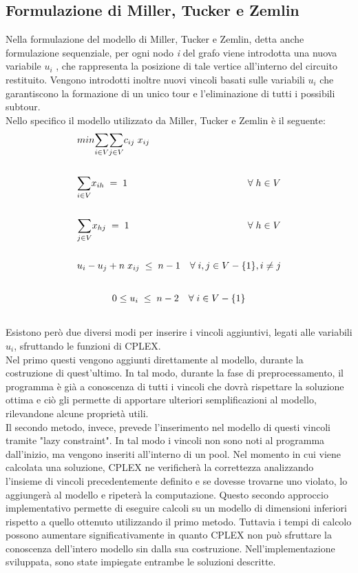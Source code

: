 \subsection{Formulazione di Miller, Tucker e Zemlin}
Nella formulazione del modello di Miller, Tucker e Zemlin, detta anche formulazione sequenziale, per ogni nodo \textit{i} del grafo viene introdotta una nuova variabile $u_i$ , che rappresenta la posizione di tale vertice all'interno del circuito restituito. Vengono introdotti inoltre nuovi vincoli basati sulle variabili $u_i$ che garantiscono la formazione di un unico tour e l'eliminazione di tutti i possibili subtour.\\
Nello specifico il modello utilizzato da Miller, Tucker e Zemlin è il seguente:
\begin{align}
& min \underset{i\in V}\sum{}\underset{j\in V}\sum{c_{ij}\; x_{ij}} \\ \notag \\
& \underset{i\in V}\sum{x_{ih}}\; =\; 1 & \forall\; h\in V \\ \notag \\
& \underset{j\in V}\sum{x_{hj}}\; =\; 1 & \forall\; h\in V \\ \notag \\
& u_i-u_j+n\; x_{ij}\;\leq\; n-1 & \forall\; i,j\in V-\{ 1\} , i\neq j \\ \notag 
\end{align}
\begin{align}
& 0\leq u_i\;\leq\; n-2 & \forall\; i\in V-\{ 1\} \\ \notag 
\end{align}
Esistono però due diversi modi per inserire i vincoli aggiuntivi, legati alle variabili $u_i$,  sfruttando le funzioni di CPLEX.\\
Nel primo questi vengono aggiunti direttamente al modello, durante la costruzione di quest'ultimo. In tal modo, durante la fase di preprocessamento, il programma è già a conoscenza di tutti i vincoli che dovrà rispettare la soluzione ottima e ciò gli permette di apportare ulteriori semplificazioni al modello, rilevandone alcune proprietà utili.\\
Il secondo metodo, invece, prevede l'inserimento nel modello di questi vincoli tramite "lazy constraint". In tal modo i vincoli non sono noti al programma dall'inizio, ma vengono inseriti all'interno di un pool. Nel momento in cui viene calcolata una soluzione, CPLEX ne verificherà la correttezza analizzando l'insieme di vincoli precedentemente definito e se dovesse trovarne uno violato, lo aggiungerà al modello e ripeterà la computazione.
 Questo secondo approccio implementativo permette di eseguire calcoli su un modello di dimensioni inferiori rispetto a quello ottenuto utilizzando il primo metodo. Tuttavia i tempi di calcolo possono aumentare significativamente in quanto CPLEX non può sfruttare la conoscenza dell'intero modello sin dalla sua costruzione. 
Nell'implementazione sviluppata, sono state impiegate entrambe le soluzioni descritte.

